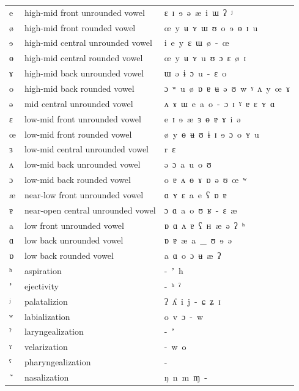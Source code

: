 \begin{center}
\begin{tabular}{lll}
\hline
e & high-mid front unrounded vowel & ɛ\ ɪ\ ɘ\ ə\ æ\ i\ \color{gray}ɯ\ ʔ\ ʲ\\
ø & high-mid front rounded vowel & œ\ y\ ʉ\ ʏ\ ɯ\ ʊ\ o\ ɘ\ \color{gray}ɵ\ ɪ\ u\\
ɘ & high-mid central unrounded vowel & i\ e\ y\ ɛ\ ɯ\ ø\ \color{gray}-\ œ\\
ɵ & high-mid central rounded vowel & œ\ y\ ʉ\ ʏ\ u\ ʊ\ ɔ\ ɛ\ \color{gray}ø\ ɪ\\
ɤ & high-mid back unrounded vowel & ɯ\ ə\ ɨ\ ɔ\ u\ -\ \color{gray}ɛ\ o\\
o & high-mid back rounded vowel & ɔ\ ʷ\ u\ ø\ ɒ\ ɐ\ ʉ\ \color{gray}ə\ ʊ\ w\ ˠ\ ʌ\ y\ œ\ ɤ\\
ə & mid central unrounded vowel & ʌ\ ɤ\ ɯ\ e\ a\ o\ \color{gray}-\ ɔ\ ɪ\ ˠ\ ɐ\ ɛ\ ʏ\ ɑ\\
ɛ & low-mid front unrounded vowel & e\ ɪ\ ɘ\ æ\ ɜ\ ɵ\ \color{gray}ɐ\ ɤ\ i\ ə\\
œ & low-mid front rounded vowel & ø\ y\ ɵ\ ʉ\ ʊ\ \color{gray}ɨ\ ɪ\ ɘ\ ɔ\ o\ ʏ\ u\\
ɜ & low-mid central unrounded vowel & r\ ɛ\\
ʌ & low-mid back unrounded vowel & ə\ ɔ\ a\ \color{gray}u\ o\ ʊ\\
ɔ & low-mid back rounded vowel & o\ ɐ\ ʌ\ ɵ\ ɤ\ ɒ\ \color{gray}ə\ ʊ\ œ\ ʷ\\
æ & near-low front unrounded vowel & ɑ\ ʏ\ ɛ\ a\ e\ \color{gray}ʕ\ ɒ\ ɐ\\
ɐ & near-open central unrounded vowel & ɔ\ ɑ\ a\ o\ ʊ\ \color{gray}ʁ\ -\ ɛ\ æ\\
a & low front unrounded vowel & ɒ\ ɑ\ ʌ\ ɐ\ ʕ\ ʜ\ æ\ ə\ \color{gray}ʔ\ ʰ\\
ɑ & low back unrounded vowel & ɒ\ ɐ\ æ\ a\ \_\ \color{gray}ʊ\ ɘ\ ə\\
ɒ & low back rounded vowel & a\ ɑ\ o\ \color{gray}ɔ\ ʉ\ æ\ ʔ\\
ʰ & aspiration & -\ ʼ\ \color{gray}h\\
ʼ & ejectivity & -\ ʰ\ \color{gray}ˀ\\
ʲ & palatalizion & ʔ\ ʎ\ i\ j\ -\ \color{gray}ɕ\ ʑ\ ɪ\\
ʷ & labialization & o\ v\ ɔ\ \color{gray}-\ w\\
ˀ & laryngealization & -\ \color{gray}ʼ\\
ˠ & velarization & -\ \color{gray}w\ o\\
ˤ & pharyngealization & -\\
\ ̃ & nasalization & ŋ\ n\ m\ ɱ\ \color{gray}-\\
\hline
\end{tabular}
%
\addtocounter{figure}{-1}
\end{center}


